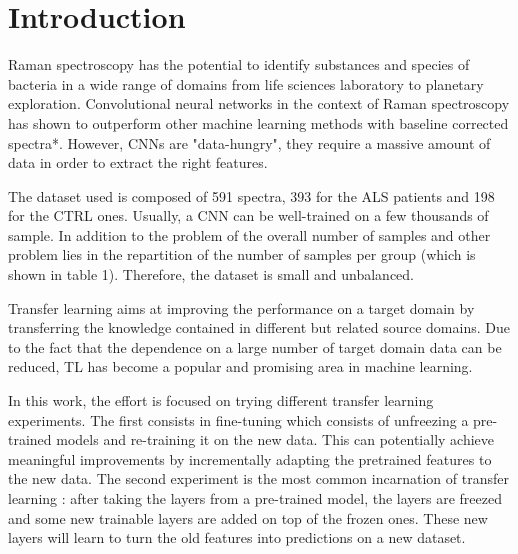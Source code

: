 \section{Introduction}
Raman spectroscopy has the potential to identify substances and species of bacteria in a wide range of domains from life sciences laboratory to planetary exploration. Convolutional neural networks in the context of Raman spectroscopy has shown to outperform other machine learning methods with baseline corrected spectra*. However, CNNs are "data-hungry", they require a massive amount of data in order to extract the right features.
	
The dataset used is composed of 591 spectra, 393 for the ALS patients and 198 for the CTRL ones. Usually, a CNN can be well-trained on a few thousands of sample. In addition to the problem of the overall number of samples and other problem lies in the repartition of the number of samples per group (which is shown in table 1). Therefore, the dataset is small and unbalanced.

Transfer learning aims at improving the performance on a target domain by transferring the knowledge contained in different but related source domains. Due to the fact that the dependence on a large number of target domain data can be reduced, TL has become a popular and promising area in machine learning.

In this work, the effort is focused on trying different transfer learning experiments. The first consists in fine-tuning which consists of unfreezing a pre-trained models and re-training it on the new data. This can potentially achieve meaningful improvements by incrementally adapting the pretrained features to the new data. The second experiment is the most common incarnation of transfer learning : after taking the layers from a pre-trained model, the layers are freezed and some new trainable layers are added on top of the frozen ones. These new layers will learn to turn the old features into predictions on a new dataset.

